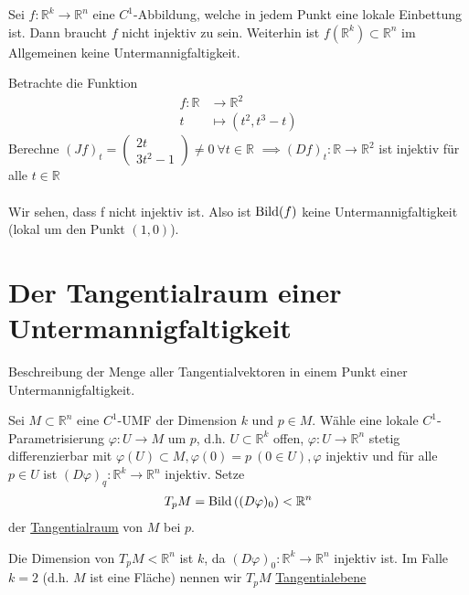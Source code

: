 \documentclass[../main.tex]{subfiles}
\begin{document}
\begin{remark}
Sei $f: \mathbb{R}^k \to \mathbb{R}^n$ eine $C^1$-Abbildung, welche in jedem Punkt eine lokale Einbettung ist.
Dann braucht $f$ nicht injektiv zu sein. Weiterhin ist $f(\mathbb{R}^k) \subset \mathbb{R}^n$ im Allgemeinen keine Untermannigfaltigkeit.
\end{remark}
\begin{example}
Betrachte die Funktion
\begin{align*}
    f \colon \mathbb{R} & \to \mathbb{R}^2 \\
    t & \mapsto (t^2,t^3-t)
\end{align*}
Berechne $(Jf)_t = \begin{pmatrix}2t \\ 3t^2 -1\end{pmatrix} \not  = 0 \ \forall t \in \mathbb{R}$
$\implies (Df)_t : \mathbb{R} \to \mathbb{R}^2$ ist injektiv für alle $t \in \mathbb{R}$
\\ \\
Wir sehen, dass f nicht injektiv ist. Also ist $\operatorname{Bild} (f)$ keine Untermannigfaltigkeit (lokal um den Punkt $(1,0)$).
\end{example}

\section{Der Tangentialraum einer Untermannigfaltigkeit}

\begin{goal}
Beschreibung der Menge aller Tangentialvektoren in einem Punkt einer Untermannigfaltigkeit.
\end{goal}

\begin{definition}
Sei $M \subset \mathbb{R}^n$ eine $C^1$-UMF der Dimension $k$ und $p \in M$. Wähle eine lokale $C^1$-Parametrisierung $\varphi : U \to M$ um $p$, d.h. $U \subset \mathbb{R}^k$ offen, $\varphi : U \to
\mathbb{R}^n$ stetig differenzierbar mit $\varphi(U) \subset M, \varphi (0)=p \ (0 \in U), \varphi$ injektiv und für alle $p\in U$ ist $(D\varphi)_q : \mathbb{R}^k \to \mathbb{R}^n $ injektiv. Setze
\begin{align*}
    T_pM = \operatorname{Bild}\left((D\varphi)_0\right) < \mathbb{R}^n
\end{align*} der \underline{Tangentialraum} von $M$ bei $p$.
\end{definition}

\begin{remark}
Die Dimension von $T_pM < \mathbb{R}^n$ ist $k$, da $(D\varphi)_0 : \mathbb{R}^k \to \mathbb{R}^n$ injektiv ist. Im Falle $k=2$ (d.h. $M$ ist eine Fläche) nennen wir $T_pM$ \underline{Tangentialebene} 
\end{remark}
\end{document}
